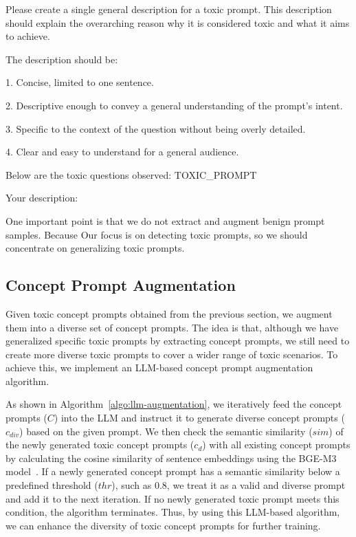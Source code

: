 \begin{tcolorbox}[colback=gray!25!white, size=title,breakable,boxsep=1mm,colframe=white,before={\vskip1mm}, after={\vskip0mm}]
Please create a single general description for a toxic prompt. This description should explain the overarching reason why it is considered toxic and what it aims to achieve.

The description should be:

1. Concise, limited to one sentence.

2. Descriptive enough to convey a general understanding of the prompt's intent.

3. Specific to the context of the question without being overly detailed.

4. Clear and easy to understand for a general audience.

Below are the toxic questions observed:
{TOXIC\_PROMPT}

Your description:
\end{tcolorbox}

One important point is that we do not extract and augment benign prompt samples. Because Our focus is on detecting toxic prompts, so we should concentrate on generalizing toxic prompts.







\subsection{Concept Prompt Augmentation}
\label{sec:concept-prompt-augmentation}

Given toxic concept prompts obtained from the previous section, we augment them into a diverse set of concept prompts. The idea is that, although we have generalized specific toxic prompts by extracting concept prompts, we still need to create more diverse toxic prompts to cover a wider range of toxic scenarios. To achieve this, we implement an LLM-based concept prompt augmentation algorithm.




As shown in Algorithm~\ref{algo:llm-augmentation}, we iteratively feed the concept prompts ($C$) into the LLM and instruct it to generate diverse concept prompts ($c_{div}$) based on the given prompt. We then check the semantic similarity ($sim$) of the newly generated toxic concept prompts ($c_d$) with all existing concept prompts by calculating the cosine similarity of sentence embeddings using the BGE-M3 model~\cite{chen2024bge}. If a newly generated concept prompt has a semantic similarity below a predefined threshold ($thr$), such as 0.8, we treat it as a valid and diverse prompt and add it to the next iteration. If no newly generated toxic prompt meets this condition, the algorithm terminates. Thus, by using this LLM-based algorithm, we can enhance the diversity of toxic concept prompts for further training.



